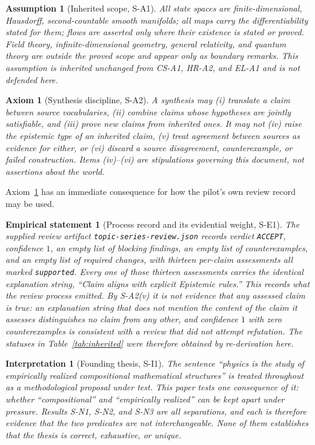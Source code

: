 \documentclass[11pt]{article}
\theoremstyle{plain}
\newtheorem{axiom}[definition]{Axiom}
\newtheorem{assumption}[definition]{Assumption}
\newtheorem{interpretation}[definition]{Interpretation}
\newtheorem{empirical}[definition]{Empirical statement}
\begin{document}
\begin{assumption}[Inherited scope, S-A1]
\label{ass:scope}
All state spaces are finite-dimensional, Hausdorff, second-countable smooth
manifolds; all maps carry the differentiability stated for them; flows are
asserted only where their existence is stated or proved. Field theory,
infinite-dimensional geometry, general relativity, and quantum theory are
outside the proved scope and appear only as boundary remarks. This assumption is
inherited unchanged from CS-A1, HR-A2, and EL-A1 and is not defended here.
\end{assumption}

\begin{axiom}[Synthesis discipline, S-A2]
\label{ax:discipline}
A synthesis may (i) translate a claim between source vocabularies, (ii) combine
claims whose hypotheses are jointly satisfiable, and (iii) prove new claims from
inherited ones. It may not (iv) raise the epistemic type of an inherited claim,
(v) treat agreement between sources as evidence for either, or (vi) discard a
source disagreement, counterexample, or failed construction. Items (iv)--(vi)
are stipulations governing this document, not assertions about the world.
\end{axiom}

Axiom~\ref{ax:discipline} has an immediate consequence for how the pilot's own
review record may be used.

\begin{empirical}[Process record and its evidential weight, S-E1]
\label{emp:review}
The supplied review artifact \texttt{topic-series-review.json} records verdict
\texttt{ACCEPT}, confidence $1$, an empty list of blocking findings, an empty
list of counterexamples, and an empty list of required changes, with thirteen
per-claim assessments all marked \texttt{supported}. Every one of those thirteen
assessments carries the identical explanation string, ``Claim aligns with
explicit Epistemic rules.'' This records what the review process emitted. By
S-A2(v) it is not evidence that any assessed claim is true: an explanation
string that does not mention the content of the claim it assesses distinguishes
no claim from any other, and confidence $1$ with zero counterexamples is
consistent with a review that did not attempt refutation. The statuses in
Table~\ref{tab:inherited} were therefore obtained by re-derivation here.
\end{empirical}

\begin{interpretation}[Founding thesis, S-I1]
\label{int:thesis}
The sentence ``physics is the study of empirically realized compositional
mathematical structures'' is treated throughout as a methodological proposal
under test. This paper tests one consequence of it: whether ``compositional''
and ``empirically realized'' can be kept apart under pressure. Results S-N1,
S-N2, and S-N3 are all separations, and each is therefore evidence that the two
predicates are not interchangeable. None of them establishes that the thesis is
correct, exhaustive, or unique.
\end{interpretation}
\end{document}
